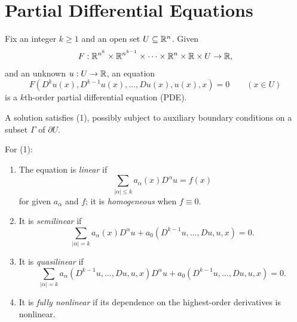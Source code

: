 
\section{Partial Differential Equations}
\label{sec:pde-introduction}

\begin{definition}
\label{def:kth-order-pde}




Fix an integer $k \geq 1$ and an open set $U \subseteq \mathbb{R}^n$. Given
$$F : \mathbb{R}^{n^k} \times \mathbb{R}^{n^{k-1}} \times \cdots \times \mathbb{R}^n \times \mathbb{R} \times U \to \mathbb{R},$$
and an unknown $u : U \to \mathbb{R}$, an equation
\begin{equation}
F(D^k u(x), D^{k-1} u(x), \ldots, Du(x), u(x), x) = 0 \qquad (x \in U)
\tag{1}
\end{equation}
is a $k$th-order partial differential equation (PDE).
\end{definition}

A solution satisfies (1), possibly subject to auxiliary boundary conditions on
a subset $\Gamma$ of $\partial U$.

\begin{definition}
\label{def:linear-semilinear-quasilinear-fully-nonlinear}





For (1):

\begin{enumerate}
\item The equation is \emph{linear} if
$$\sum_{|\alpha| \leq k} a_\alpha(x) D^\alpha u = f(x)$$
for given $a_\alpha$ and $f$; it is \emph{homogeneous} when $f \equiv 0$.

\item It is \emph{semilinear} if
$$\sum_{|\alpha|=k} a_\alpha(x) D^\alpha u + a_0(D^{k-1}u, \ldots, Du, u, x) = 0.$$

\item It is \emph{quasilinear} if
$$\sum_{|\alpha|=k} a_\alpha(D^{k-1}u, \ldots, Du, u, x) D^\alpha u + a_0(D^{k-1}u, \ldots, Du, u, x) = 0.$$

\item It is \emph{fully nonlinear} if its dependence on the highest-order derivatives is nonlinear.
\end{enumerate}
\end{definition}

